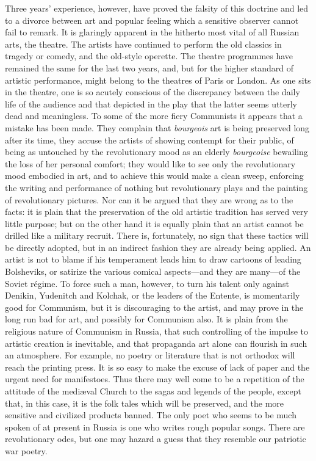 Three years' experience, however, have proved the falsity of this doctrine and led to a divorce between art and popular feeling which a sensitive observer cannot fail to remark. It is glaringly apparent in the hitherto most vital of all Russian arts, the theatre. The artists have continued to perform the old classics in tragedy or comedy, and the old-style operette. The theatre programmes have remained the same for the last two years, and, but for the higher standard of artistic performance, might belong to the theatres of Paris or London. As one sits in the theatre, one is so acutely conscious of the discrepancy between the daily life of the audience and that depicted in the play that the latter seems utterly dead and meaningless. To some of the more fiery Communists it appears that a mistake has been made. They complain that \emph{bourgeois} art is being preserved long after its time, they accuse the artists of showing contempt for their public, of being as untouched by the revolutionary mood as an elderly \emph{bourgeoise} bewailing the loss of her personal comfort; they would like to see only the revolutionary mood embodied in art, and to achieve this would make a clean sweep, enforcing the writing and performance of nothing but revolutionary plays and the painting of revolutionary pictures. Nor can it be argued that they are wrong as to the facts: it is plain that the preservation of the old artistic tradition has served very little purpose; but on the other hand it is equally plain that an artist cannot be drilled like a military recruit. There is, fortunately, no sign that these tactics will be directly adopted, but in an indirect fashion they are already being applied. An artist is not to blame if his temperament leads him to draw cartoons of leading Bolsheviks, or satirize the various comical aspects---and they are many---of the Soviet régime. To force such a man, however, to turn his talent only against Denikin, Yudenitch and Kolchak, or the leaders of the Entente, is momentarily good for Communism, but it is discouraging to the artist, and may prove in the long run bad for art, and possibly for Communism also. It is plain from the religious nature of Communism in Russia, that such controlling of the impulse to artistic creation is inevitable, and that propaganda art alone can flourish in such an atmosphere. For example, no poetry or literature that is not orthodox will reach the printing press. It is so easy to make the excuse of lack of paper and the urgent need for manifestoes. Thus there may well come to be a repetition of the attitude of the mediæval Church to the sagas and legends of the people, except that, in this case, it is the folk tales which will be preserved, and the more sensitive and civilized products banned. The only poet who seems to be much spoken of at present in Russia is one who writes rough popular songs. There are revolutionary odes, but one may hazard a guess that they resemble our patriotic war poetry.

